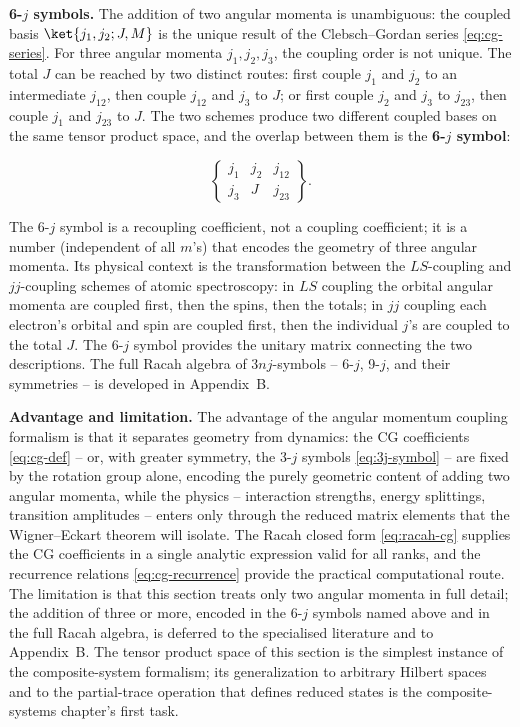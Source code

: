 \medskip\noindent\textbf{6-$j$ symbols.}
The addition of two angular momenta is unambiguous: the coupled basis $\ket{j_1,j_2;J,M}$ is the unique result of the Clebsch--Gordan series \eqref{eq:cg-series}. For three angular momenta $j_1,j_2,j_3$, the coupling order is not unique. The total $J$ can be reached by two distinct routes: first couple $j_1$ and $j_2$ to an intermediate $j_{12}$, then couple $j_{12}$ and $j_3$ to $J$; or first couple $j_2$ and $j_3$ to $j_{23}$, then couple $j_1$ and $j_{23}$ to $J$. The two schemes produce two different coupled bases on the same tensor product space, and the overlap between them is the \textbf{6-$j$ symbol}:
\begin{linenomath}
  \begin{equation*}
    \begin{Bmatrix}
      j_1 & j_2 & j_{12} \\
      j_3 & J   & j_{23}
    \end{Bmatrix}.
  \end{equation*}
\end{linenomath}
The 6-$j$ symbol is a recoupling coefficient, not a coupling coefficient; it is a number (independent of all $m$'s) that encodes the geometry of three angular momenta. Its physical context is the transformation between the $LS$-coupling and $jj$-coupling schemes of atomic spectroscopy: in $LS$ coupling the orbital angular momenta are coupled first, then the spins, then the totals; in $jj$ coupling each electron's orbital and spin are coupled first, then the individual $j$'s are coupled to the total $J$. The 6-$j$ symbol provides the unitary matrix connecting the two descriptions. The full Racah algebra of $3nj$-symbols -- 6-$j$, 9-$j$, and their symmetries -- is developed in Appendix~B.

\medskip\noindent\textbf{Advantage and limitation.}
The advantage of the angular momentum coupling formalism is that it separates geometry from dynamics: the CG coefficients \eqref{eq:cg-def} -- or, with greater symmetry, the 3-$j$ symbols \eqref{eq:3j-symbol} -- are fixed by the rotation group alone, encoding the purely geometric content of adding two angular momenta, while the physics -- interaction strengths, energy splittings, transition amplitudes -- enters only through the reduced matrix elements that the Wigner--Eckart theorem will isolate. The Racah closed form \eqref{eq:racah-cg} supplies the CG coefficients in a single analytic expression valid for all ranks, and the recurrence relations \eqref{eq:cg-recurrence} provide the practical computational route. The limitation is that this section treats only two angular momenta in full detail; the addition of three or more, encoded in the 6-$j$ symbols named above and in the full Racah algebra, is deferred to the specialised literature and to Appendix~B. The tensor product space of this section is the simplest instance of the composite-system formalism; its generalization to arbitrary Hilbert spaces and to the partial-trace operation that defines reduced states is the composite-systems chapter's first task.

